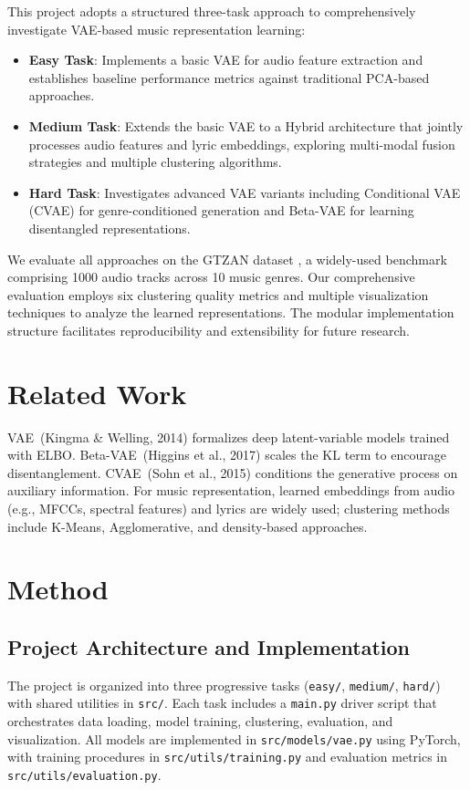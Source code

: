 \documentclass[11pt]{article}
\begin{document}
This project adopts a structured three-task approach to comprehensively investigate VAE-based music representation learning:
\begin{itemize}
\item \textbf{Easy Task}: Implements a basic VAE for audio feature extraction and establishes baseline performance metrics against traditional PCA-based approaches.
\item \textbf{Medium Task}: Extends the basic VAE to a Hybrid architecture that jointly processes audio features and lyric embeddings, exploring multi-modal fusion strategies and multiple clustering algorithms.
\item \textbf{Hard Task}: Investigates advanced VAE variants including Conditional VAE (CVAE) for genre-conditioned generation and Beta-VAE for learning disentangled representations.
\end{itemize}

We evaluate all approaches on the GTZAN dataset \cite{gtzan}, a widely-used benchmark comprising 1000 audio tracks across 10 music genres. Our comprehensive evaluation employs six clustering quality metrics and multiple visualization techniques to analyze the learned representations. The modular implementation structure facilitates reproducibility and extensibility for future research.

\section{Related Work}
VAE~(Kingma \& Welling, 2014) formalizes deep latent-variable models trained with ELBO. Beta-VAE~(Higgins et al., 2017) scales the KL term to encourage disentanglement. CVAE~(Sohn et al., 2015) conditions the generative process on auxiliary information. For music representation, learned embeddings from audio (e.g., MFCCs, spectral features) and lyrics are widely used; clustering methods include K-Means, Agglomerative, and density-based approaches.

\section{Method}
\subsection{Project Architecture and Implementation}
The project is organized into three progressive tasks (\texttt{easy/}, \texttt{medium/}, \texttt{hard/}) with shared utilities in \texttt{src/}. Each task includes a \texttt{main.py} driver script that orchestrates data loading, model training, clustering, evaluation, and visualization. All models are implemented in \texttt{src/models/vae.py} using PyTorch, with training procedures in \texttt{src/utils/training.py} and evaluation metrics in \texttt{src/utils/evaluation.py}.
\end{document}

